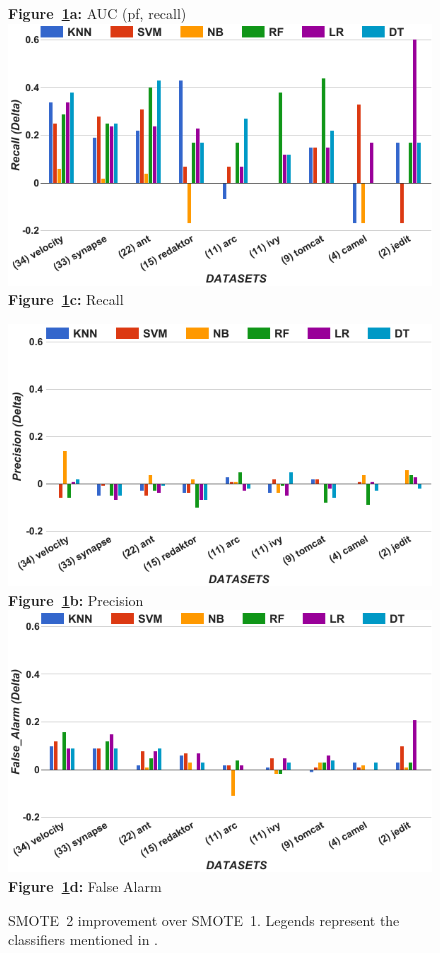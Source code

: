 \begin{figure}[!t]
\begin{minipage}{.5\linewidth}
  {\bf Figure~\ref{fig:tuned}a:} AUC (pf, recall)
        \includegraphics[width=.95\linewidth]{./fig/Recall_tuned.png}
  {\bf Figure~\ref{fig:tuned}c:} Recall
    \end{minipage}%
\begin{minipage}{.5\linewidth}
        \centering
        \includegraphics[width=.95\linewidth]{./fig/prec_tuned.png}
  {\bf Figure~\ref{fig:tuned}b:} Precision
        \includegraphics[width=.95\linewidth]{./fig/pf_tuned.png}
  {\bf Figure~\ref{fig:tuned}d:} False Alarm
    \end{minipage}%
    \caption{SMOTE~2 improvement over SMOTE~1. Legends represent the classifiers mentioned in .}
    \label{fig:tuned}
\end{figure}

